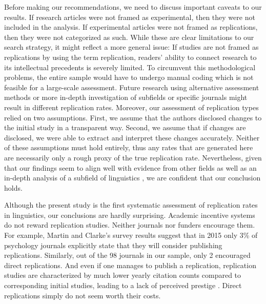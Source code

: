 \documentclass[cm,linguex]{glossa}
\begin{document}
Before making our recommendations, we need to discuss important caveats to our results. If research articles were not framed as experimental, then they were not included in the analysis. If experimental articles were not framed as replications, then they were not categorized as such. While these are clear limitations to our search strategy, it might reflect a more general issue: If studies are not framed as replications by using the term replication, readers' ability to connect research to its intellectual precedents is severely limited. To circumvent this methodological problems, the entire sample would have to undergo manual coding which is not feasible for a large-scale assessment. Future research using alternative assessment methods or more in-depth investigation of subfields or specific journals might result in different replication rates.
Moreover, our assessment of replication types relied on two assumptions. First, we assume that the authors disclosed changes to the initial study in a transparent way. Second, we assume that if changes are disclosed, we were able to extract and interpret these changes accurately. Neither of these assumptions must hold entirely, thus any rates that are generated here are necessarily only a rough proxy of the true replication rate. Nevertheless, given that our findings seem to align well with evidence from other fields as well as an in-depth analysis of a subfield of linguistics \citep{marsden_replication_2018}, we are confident that our conclusion holds.

Although the present study is the first systematic assessment of replication rates in linguistics, our conclusions are hardly surprising. Academic incentive systems do not reward replication studies. Neither journals nor funders encourage them. For example, Martin and Clarke's \citeyearpar{martin_are_2017} survey results suggest that in 2015 only 3\% of psychology journals explicitly state that they will consider publishing replications. Similarly, out of the 98 journals in our sample, only 2 encouraged direct replications. And even if one manages to publish a replication, replication studies are characterized by much lower yearly citation counts compared to corresponding initial studies, leading to a lack of perceived prestige \citep[e.g.,][]{koole_rewarding_2012, nosek_scientific_2012, marsden_replication_2018}. Direct replications simply do not seem worth their costs.
\end{document}
